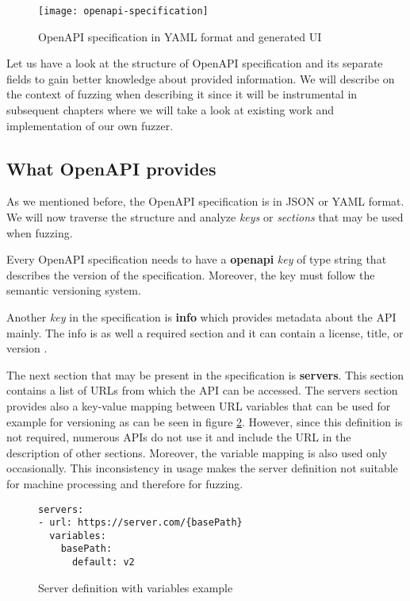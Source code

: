 \begin{figure}[h]
  \texttt{[image: openapi-specification]}
  \caption{OpenAPI specification in YAML format and generated UI}
  \label{fig:openapi-specification}
\end{figure}

Let us have a look at the structure of OpenAPI specification and its separate fields to gain better knowledge about provided information. We will describe on the context of fuzzing when describing it since it will be instrumental in subsequent chapters where we will take a look at existing work and implementation of our own fuzzer.

\subsection{What OpenAPI provides}
As we mentioned before, the OpenAPI specification is in JSON or YAML format. We will now traverse the structure and analyze \textit{keys} or \textit{sections} that may be used when fuzzing.

Every OpenAPI specification needs to have a \textbf{openapi} \textit{key} of type string that describes the version of the specification. Moreover, the key must follow the semantic versioning system.

Another \textit{key} in the specification is \textbf{info} which provides metadata about the API mainly. The info is as well a required section and it can contain a license, title, or version \cite{openapi2020github}.

The next section that may be present in the specification is \textbf{servers}. This section contains a list of URLs from which the API can be accessed. The servers section provides also a key-value mapping between URL variables that can be used for example for versioning as can be seen in figure \ref{fig:Server definition with variables}. However, since this definition is not required, numerous APIs do not use it and include the URL in the description of other sections. Moreover, the variable mapping is also used only occasionally. This inconsistency in usage makes the server definition not suitable for machine processing and therefore for fuzzing.

\begin{figure}[H]
  \begin{verbatim}
servers:
- url: https://server.com/{basePath}
  variables:
    basePath:
      default: v2
  \end{verbatim}
  \caption{Server definition with variables example}
  \label{fig:Server definition with variables}
\end{figure}


